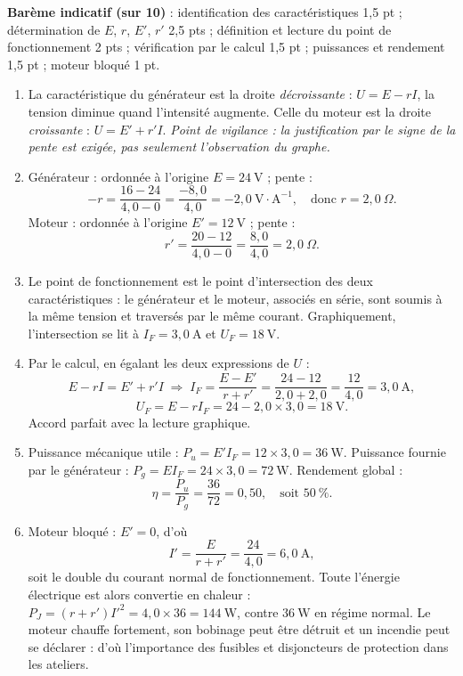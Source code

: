\documentclass[11pt]{article}
\begin{document}
\begin{corrige}
\textbf{Barème indicatif (sur 10)} : identification des caractéristiques 1,5 pt ; détermination de $E$, $r$, $E'$, $r'$ 2,5 pts ; définition et lecture du point de fonctionnement 2 pts ; vérification par le calcul 1,5 pt ; puissances et rendement 1,5 pt ; moteur bloqué 1 pt.
\begin{enumerate}
\item La caractéristique du générateur est la droite \emph{décroissante} : $U = E - rI$, la tension diminue quand l'intensité augmente. Celle du moteur est la droite \emph{croissante} : $U = E' + r'I$. \emph{Point de vigilance : la justification par le signe de la pente est exigée, pas seulement l'observation du graphe.}
\item Générateur : ordonnée à l'origine $E = 24~\text{V}$ ; pente :
\[ -r = \dfrac{16 - 24}{4,0 - 0} = \dfrac{-8,0}{4,0} = -2,0~\text{V}\cdot\text{A}^{-1}, \quad \text{donc } r = 2,0~\Omega. \]
Moteur : ordonnée à l'origine $E' = 12~\text{V}$ ; pente :
\[ r' = \dfrac{20 - 12}{4,0 - 0} = \dfrac{8,0}{4,0} = 2,0~\Omega. \]
\item Le point de fonctionnement est le point d'intersection des deux caractéristiques : le générateur et le moteur, associés en série, sont soumis à la même tension et traversés par le même courant. Graphiquement, l'intersection se lit à $I_F = 3,0~\text{A}$ et $U_F = 18~\text{V}$.
\item Par le calcul, en égalant les deux expressions de $U$ :
\[ E - rI = E' + r'I \;\Rightarrow\; I_F = \dfrac{E - E'}{r + r'} = \dfrac{24 - 12}{2,0 + 2,0} = \dfrac{12}{4,0} = 3,0~\text{A}, \]
\[ U_F = E - rI_F = 24 - 2,0 \times 3,0 = 18~\text{V}. \]
Accord parfait avec la lecture graphique.
\item Puissance mécanique utile : $P_u = E'I_F = 12 \times 3,0 = 36~\text{W}$. Puissance fournie par le générateur : $P_g = EI_F = 24 \times 3,0 = 72~\text{W}$. Rendement global :
\[ \eta = \dfrac{P_u}{P_g} = \dfrac{36}{72} = 0,50, \quad \text{soit } 50~\%. \]
\item Moteur bloqué : $E' = 0$, d'où
\[ I' = \dfrac{E}{r + r'} = \dfrac{24}{4,0} = 6,0~\text{A}, \]
soit le double du courant normal de fonctionnement. Toute l'énergie électrique est alors convertie en chaleur : $P_J = (r + r')I'^2 = 4,0 \times 36 = 144~\text{W}$, contre $36~\text{W}$ en régime normal. Le moteur chauffe fortement, son bobinage peut être détruit et un incendie peut se déclarer : d'où l'importance des fusibles et disjoncteurs de protection dans les ateliers.
\end{enumerate}
\end{corrige}
\end{document}
